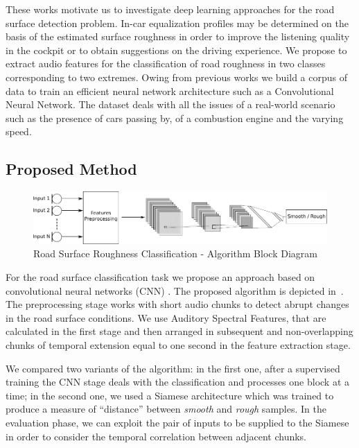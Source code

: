 These works motivate us to investigate deep learning approaches for the road surface detection problem. In-car equalization profiles may be determined on the basis of the estimated surface roughness in order to improve the listening quality in the cockpit or to obtain suggestions on the driving experience. We propose to extract audio features for the classification of road roughness in two classes corresponding to two extremes. Owing from previous works we build a corpus of data to train an efficient neural network architecture such as a Convolutional Neural Network. The dataset deals with all the issues of a real-world scenario such as the presence of cars passing by, of a combustion engine and the varying speed. %

\subsection{Proposed Method}

\begin{figure}[h]
	\centering
	\includegraphics[width=1.0\linewidth]{img/flowchart_orizzontale}
	\caption[Road Surface Roughness Classification]{Road Surface Roughness Classification - Algorithm Block Diagram}
	\label{fig:algoritmo-orizzontale}
\end{figure}


For the road surface classification task we propose an approach based on convolutional neural networks (CNN) \cite{lecun1995convolutional}. The proposed algorithm is depicted in~. The preprocessing stage works with short audio chunks to detect abrupt changes in the road surface conditions. We use Auditory Spectral Features, that are calculated in the first stage and then arranged in subsequent and non-overlapping chunks of temporal extension equal to one second in the feature extraction stage. 

We compared two variants of the algorithm: in the first one, after a supervised training the CNN stage deals with the classification and processes one block at a time; in the second one, we used a Siamese architecture which was trained to produce a measure of ``distance'' between \textit{smooth} and \textit{rough} samples. In the evaluation phase, we can exploit the pair of inputs to be supplied to the Siamese in order to consider the temporal correlation between adjacent chunks.

